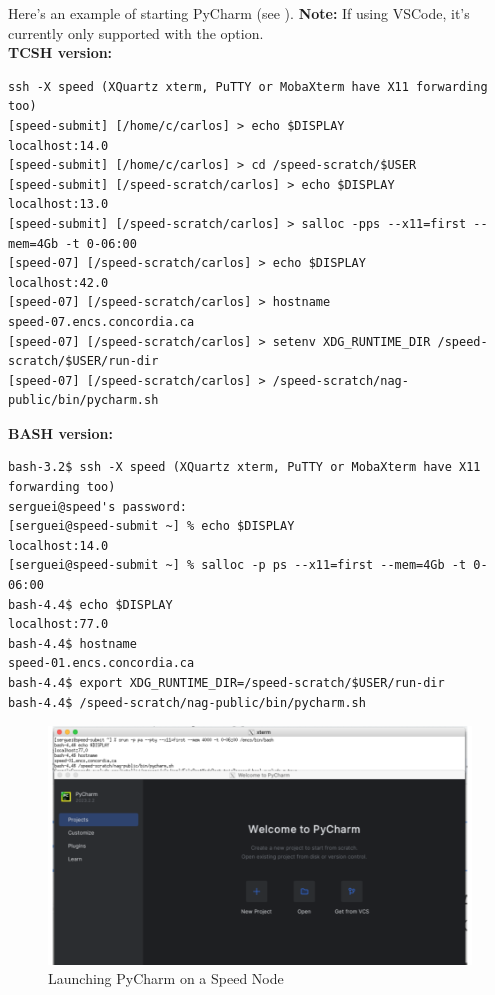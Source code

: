 \noindent
Here's an example of starting PyCharm (see ). 
\textbf{Note:} If using VSCode, it's currently only supported with the  option.\\

\noindent \textbf{TCSH version:}
\small
\begin{verbatim}
ssh -X speed (XQuartz xterm, PuTTY or MobaXterm have X11 forwarding too)
[speed-submit] [/home/c/carlos] > echo $DISPLAY
localhost:14.0
[speed-submit] [/home/c/carlos] > cd /speed-scratch/$USER
[speed-submit] [/speed-scratch/carlos] > echo $DISPLAY
localhost:13.0
[speed-submit] [/speed-scratch/carlos] > salloc -pps --x11=first --mem=4Gb -t 0-06:00
[speed-07] [/speed-scratch/carlos] > echo $DISPLAY
localhost:42.0
[speed-07] [/speed-scratch/carlos] > hostname
speed-07.encs.concordia.ca
[speed-07] [/speed-scratch/carlos] > setenv XDG_RUNTIME_DIR /speed-scratch/$USER/run-dir
[speed-07] [/speed-scratch/carlos] > /speed-scratch/nag-public/bin/pycharm.sh
\end{verbatim}
\normalsize
\noindent \textbf{BASH version:}
\small
\begin{verbatim}
bash-3.2$ ssh -X speed (XQuartz xterm, PuTTY or MobaXterm have X11 forwarding too)
serguei@speed's password: 
[serguei@speed-submit ~] % echo $DISPLAY
localhost:14.0
[serguei@speed-submit ~] % salloc -p ps --x11=first --mem=4Gb -t 0-06:00 
bash-4.4$ echo $DISPLAY
localhost:77.0
bash-4.4$ hostname
speed-01.encs.concordia.ca
bash-4.4$ export XDG_RUNTIME_DIR=/speed-scratch/$USER/run-dir
bash-4.4$ /speed-scratch/nag-public/bin/pycharm.sh
\end{verbatim}
\normalsize

\begin{figure}[htpb]
	\includegraphics[width=\columnwidth]{images/pycharm}
	\caption{Launching PyCharm on a Speed Node}
	\label{fig:pycharm}
\end{figure}

